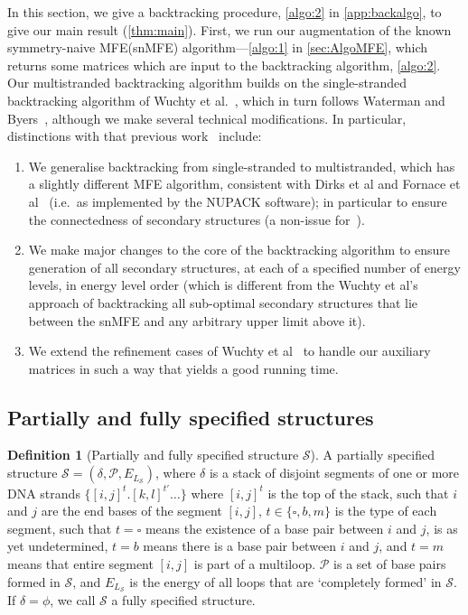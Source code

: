 \documentclass[11pt,letterpaper]{article}  \usepackage[margin=1in]{geometry}
\theoremstyle{definition}  \newtheorem{Definition}[theorem]{Definition}
\newcommand{\snMFE}{snMFE\xspace}
\newcommand{\symnMFE}{symmetry-naive MFE\xspace}
\begin{document}
In this section, we give a backtracking procedure, 
\cref{algo:2} in \cref{app:backalgo}, 
to give our main result (\cref{thm:main}). 
First,  we run our augmentation of the known \symnMFE (\snMFE) algorithm---\cref{algo:1} in \cref{sec:AlgoMFE}, which returns some matrices which are input to the backtracking algorithm, \cref{algo:2}. 
Our multistranded backtracking algorithm builds on the single-stranded backtracking algorithm of Wuchty et al.~\cite{wuchty1999complete},
which in turn follows Waterman and Byers~\cite{waterman1985dynamic}, 
 although we make several technical modifications. 
In particular, distinctions with that previous work~\cite{wuchty1999complete,waterman1985dynamic} include: 
\begin{enumerate}
	\item We generalise backtracking from single-stranded to multistranded, which has a slightly different MFE algorithm, consistent with Dirks et al and Fornace et al~\cite{dirks2007thermodynamic,fornace2020unified} (i.e.~as implemented by the NUPACK software); in particular to ensure  the connectedness of secondary structures (a non-issue for~\cite{wuchty1999complete,waterman1985dynamic}). 
	\item We make major changes to the core of the backtracking algorithm  to ensure generation of all secondary structures, 
	at each of a specified number of energy levels, in energy level order 
	(which is different from the Wuchty et al's~\cite{wuchty1999complete} approach of backtracking all sub-optimal secondary structures that lie between the \snMFE and any arbitrary upper limit above it). 
	\item We extend the refinement cases of  Wuchty et al~\cite{wuchty1999complete} to handle our auxiliary matrices in such a way that yields  a good running time. 
\end{enumerate}

\subsection{Partially and fully specified structures} 


\begin{Definition}[Partially and fully specified structure $\mathcal{S}$]
	A partially specified structure $\mathcal{S} = (\delta,\mathcal{P},E_{L_\mathcal{S}})$, where $\delta$ is a stack of disjoint segments of one or more DNA strands $\{[i,j]^t. [k,l]^{t'} \ldots\}$ where $[i,j]^t$ is the top of the stack, such that $i$ and $j$ are the end bases of the segment $[i,j]$, $t \in \{\square,b,m\}$ is the type of each segment, 
	such that $t = \square$ means the existence of a base pair between $i$ and $j$, is as yet undetermined, 
	$t =b$ means there is a base pair between $i$ and $j$, and 
	$t = m$ means that entire segment $[i,j]$ is part of a multiloop. 
	$\mathcal{P}$ is a set of base pairs formed in $\mathcal{S}$, and $E_{L_\mathcal{S}}$ is the energy of all loops that are 
	`completely formed' in $\mathcal{S}$. If $\delta = \phi$, we call $\mathcal{S}$ a fully specified structure.
\end{Definition}
\end{document}
